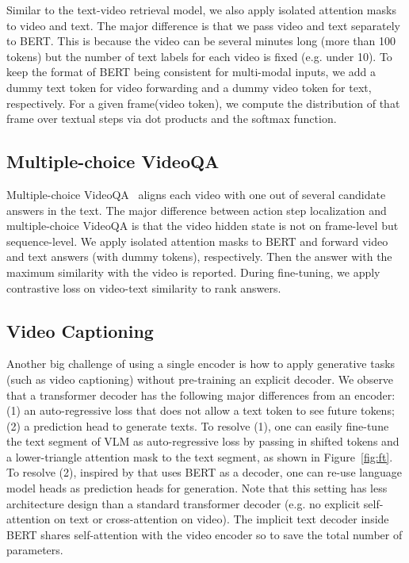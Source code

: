 \documentclass[11pt,a4paper]{article}
\begin{document}
Similar to the text-video retrieval model, we also apply isolated attention masks to video and text.
The major difference is that we pass video and text separately to BERT.
This is because the video can be several minutes long (more than 100 tokens)
but the number of text labels for each video is fixed (e.g. under 10).
To keep the format of BERT being consistent for multi-modal inputs, we add a dummy text token for video forwarding and a dummy video token for text, respectively.
For a given frame(video token), we compute the distribution of that frame over textual steps via dot products and the softmax function. 

\subsection{Multiple-choice VideoQA}
Multiple-choice VideoQA~\cite{yu2018joint} aligns each video with one out of several candidate answers in the text.
The major difference between action step localization and multiple-choice VideoQA is that the video hidden state is not on frame-level but sequence-level.
We apply isolated attention masks to BERT and forward video and text answers (with dummy tokens), respectively.
Then the answer with the maximum similarity with the video is  reported.
During fine-tuning, we apply contrastive loss on video-text similarity to rank answers.

\subsection{Video Captioning}
Another big challenge of using a single encoder is how to apply generative tasks (such as video captioning) without pre-training an explicit decoder.
We observe that a transformer decoder \cite{vaswani2017attention} has the following major differences from an encoder:
(1) an auto-regressive loss that does not allow a text token to see future tokens;
(2) a prediction head to generate texts.
To resolve (1), one can easily fine-tune the text segment of VLM as auto-regressive loss by passing in shifted tokens and a lower-triangle attention mask to the text segment, as shown in Figure~\ref{fig:ft}. 
To resolve (2), inspired by \cite{rothe-etal-2020-leveraging,zhou2020unified} that uses BERT as a decoder, one can re-use language model heads as prediction heads for generation.
Note that this setting has less architecture design than a standard transformer decoder (e.g. no explicit self-attention on text or cross-attention on video).
The implicit text decoder inside BERT shares self-attention with the video encoder so to save the total number of parameters.
\end{document}
